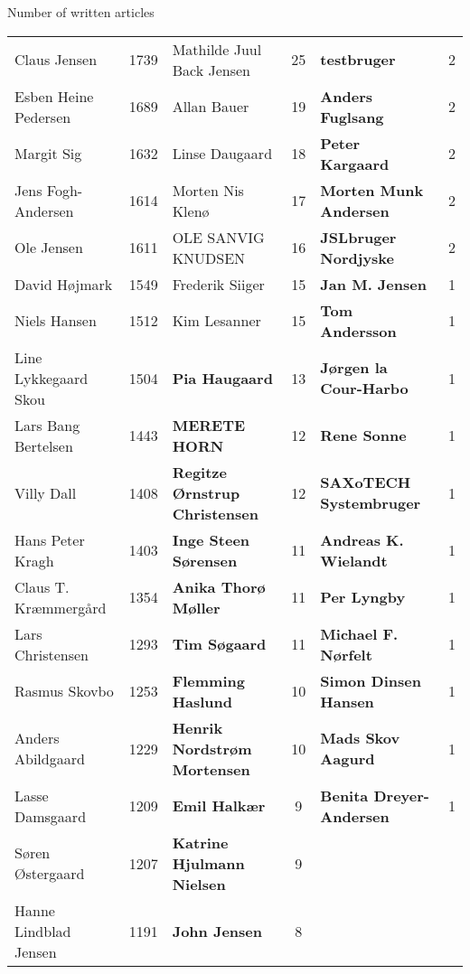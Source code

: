 \begin{frame}{\insertsection}{\insertsubsection}
\begin{block}{Number of written articles}
\begin{table}
{\begin{tabular}{l|c|l|c|l|c}
				Claus Jensen & 1739 & Mathilde Juul Back Jensen & 25 & \textbf{testbruger} & 2 \\
				Esben Heine Pedersen & 1689 & Allan Bauer & 19 & \textbf{Anders Fuglsang} & 2 \\
				Margit Sig & 1632 & Linse Daugaard & 18 & \textbf{Peter Kargaard} & 2 \\
				Jens Fogh-Andersen & 1614 & Morten Nis Klenø & 17 & \textbf{Morten Munk Andersen} & 2 \\
				Ole Jensen & 1611 & OLE SANVIG KNUDSEN & 16 & \textbf{JSLbruger Nordjyske} & 2 \\
				David Højmark & 1549 & Frederik Siiger & 15 & \textbf{Jan M. Jensen} & 1 \\
				Niels Hansen & 1512 & Kim Lesanner & 15 & \textbf{Tom Andersson} & 1 \\
				Line Lykkegaard Skou & 1504 & \textbf{Pia Haugaard} & 13 & \textbf{Jørgen la Cour-Harbo} & 1 \\
				Lars Bang Bertelsen & 1443 & \textbf{MERETE HORN} & 12 & \textbf{Rene Sonne} & 1 \\
				Villy Dall & 1408 & \textbf{Regitze Ørnstrup Christensen} & 12 & \textbf{SAXoTECH Systembruger} & 1 \\
				Hans Peter Kragh & 1403 & \textbf{Inge Steen Sørensen} & 11 & \textbf{Andreas K. Wielandt} & 1 \\
				Claus T. Kræmmergård & 1354 & \textbf{Anika Thorø Møller} & 11 & \textbf{Per Lyngby} & 1 \\
				Lars Christensen & 1293 & \textbf{Tim Søgaard} & 11 & \textbf{Michael F. Nørfelt} & 1 \\
				Rasmus Skovbo & 1253 & \textbf{Flemming Haslund} & 10 & \textbf{Simon Dinsen Hansen} & 1 \\
				Anders Abildgaard & 1229 & \textbf{Henrik Nordstrøm Mortensen} & 10 & \textbf{Mads Skov Aagurd} & 1 \\
				Lasse Damsgaard & 1209 & \textbf{Emil Halkær} & 9 & \textbf{Benita Dreyer-Andersen} & 1 \\
				Søren Østergaard & 1207 & \textbf{Katrine Hjulmann Nielsen} & 9 & & \\
				Hanne Lindblad Jensen & 1191 & \textbf{John Jensen} & 8 & & \\
				\bottomrule
			\end{tabular}
			}
		\end{table}
	\end{block}
\end{frame}

